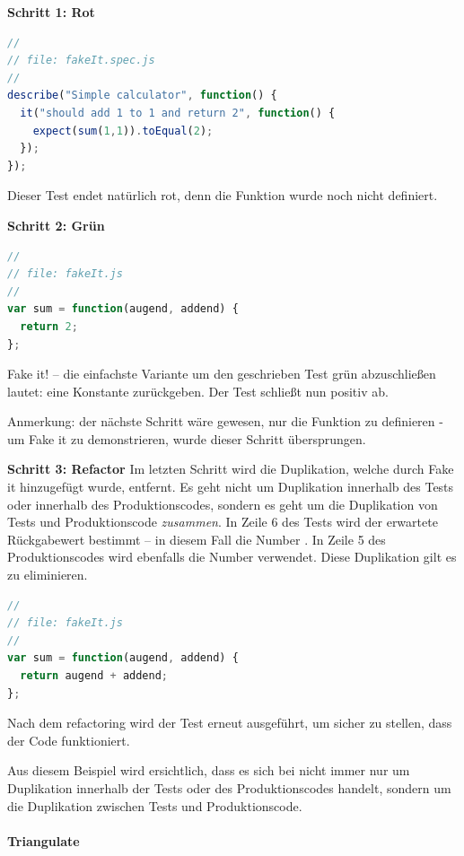 {\textbf{Schritt 1: Rot}
\begin{lstlisting}[language=JavaScript]
//
// file: fakeIt.spec.js
//
describe("Simple calculator", function() {
  it("should add 1 to 1 and return 2", function() {
    expect(sum(1,1)).toEqual(2);
  });
});
\end{lstlisting}
Dieser Test endet natürlich rot, denn die Funktion  wurde noch nicht definiert.

\textbf{Schritt 2: Grün}
\begin{lstlisting}[language=JavaScript]
//
// file: fakeIt.js
//
var sum = function(augend, addend) {
  return 2;
};
\end{lstlisting}

Fake it! -- die einfachste Variante um den geschrieben Test grün abzuschließen lautet: eine Konstante zurückgeben. Der Test schließt nun positiv ab.

Anmerkung: der nächste Schritt wäre gewesen, nur die Funktion  zu definieren - um Fake it zu demonstrieren, wurde dieser Schritt übersprungen.

\textbf{Schritt 3: Refactor} \newline
Im letzten Schritt wird die Duplikation, welche durch Fake it hinzugefügt wurde, entfernt. Es geht nicht um Duplikation innerhalb des Tests oder innerhalb des Produktionscodes, sondern es geht um die Duplikation von Tests und Produktionscode \textit{zusammen}. In Zeile 6 des Tests wird der erwartete Rückgabewert bestimmt -- in diesem Fall die Number \glqq{2\grqq}. In Zeile 5 des Produktionscodes wird ebenfalls die Number \glqq{2\grqq} verwendet. Diese Duplikation gilt es zu eliminieren.

\begin{lstlisting}[language=JavaScript]
//
// file: fakeIt.js
//
var sum = function(augend, addend) {
  return augend + addend;
};
\end{lstlisting}

Nach dem refactoring wird der Test erneut ausgeführt, um sicher zu stellen, dass der Code funktioniert.

Aus diesem Beispiel wird ersichtlich, dass es sich bei  nicht immer nur um Duplikation innerhalb der Tests oder des Produktionscodes handelt, sondern um die Duplikation zwischen Tests und Produktionscode.

\paragraph{Triangulate}

}
